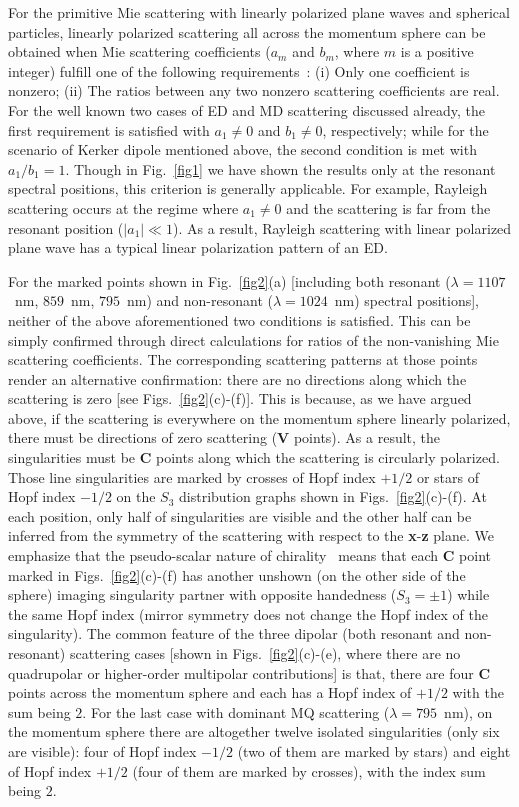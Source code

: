 \documentclass[aps,twocolumn,superscriptaddress]{revtex4-1}
\newcounter{Fig}
\begin{document}
For the primitive Mie scattering with linearly polarized plane waves and spherical particles, linearly polarized scattering all across the momentum sphere can be obtained when Mie scattering coefficients ($a_m$ and $b_m$, where $m$ is a positive integer) fulfill one of the following requirements~\cite{Bohren1983_book}: (i) Only one coefficient is nonzero; (ii) The ratios between any two nonzero scattering coefficients are real. For the well known two cases of ED and MD scattering discussed already, the first requirement is satisfied with $a_1\neq0$ and $b_1\neq0$, respectively; while for the scenario of Kerker dipole mentioned above, the second condition is met with $a_1/b_1=1$.  Though in Fig.~\ref{fig1} we have shown the results only at the resonant spectral positions, this criterion is generally applicable. For example, Rayleigh scattering occurs at the regime where $a_1\neq0$ and the scattering is far from the resonant position ($|a_1| \ll 1$). As a result, Rayleigh scattering with linear polarized plane wave has a typical linear polarization pattern of an ED.

For the marked points shown in Fig.~\ref{fig2}(a) [including both resonant ($\lambda=1107$~nm, $859$~nm, $795$~nm) and non-resonant ($\lambda=1024$~nm) spectral positions], neither of the above aforementioned two conditions is satisfied. This can be simply confirmed through direct calculations for  ratios of the non-vanishing Mie scattering coefficients. The corresponding scattering patterns at those points render an alternative confirmation: there are no directions along which the scattering is zero [see Figs.~\ref{fig2}(c)-(f)]. This is because, as we have argued above, if the scattering is everywhere on the momentum sphere linearly polarized, there must be directions of zero scattering (\textbf{V} points). As a result, the singularities must be $\textbf{C}$ points along which the scattering is circularly polarized. Those line singularities are marked by crosses of Hopf index $+1/2$ or stars of Hopf index $-1/2$  on the $S_3$ distribution graphs shown in Figs.~\ref{fig2}(c)-(f). At each position, only half of singularities are visible and the other half can be inferred from the symmetry of the scattering with respect to the \textbf{x}-\textbf{z} plane.  We emphasize that the pseudo-scalar nature of chirality~\cite{jackson1962classical,BIRSS_1964} means that each \textbf{C} point marked in Figs.~\ref{fig2}(c)-(f) has another unshown (on the other side of the sphere) imaging singularity partner with opposite handedness ($S_3=\pm1$) while the same Hopf index (mirror symmetry does not change the Hopf index of the singularity). The common feature of the three dipolar (both resonant and non-resonant) scattering cases [shown in Figs.~\ref{fig2}(c)-(e), where there are no quadrupolar or higher-order multipolar contributions] is that, there are four \textbf{C} points across the momentum sphere and each has a Hopf index of $+1/2$  with the sum being $2$. For the last case with dominant MQ scattering ($\lambda=795$~nm), on the momentum sphere there are altogether twelve isolated singularities (only six are visible): four of Hopf index $-1/2$ (two of them are marked by stars) and eight of Hopf index $+1/2$ (four of them are marked by crosses), with the index sum being $2$.
\end{document}
